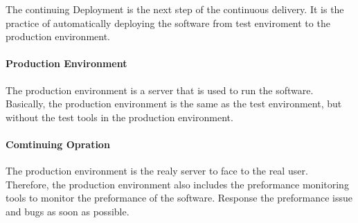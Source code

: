 The continuing Deployment is the next step of the continuous delivery.
It is the practice of automatically deploying the software from test enviroment
to the production environment.

\paragraph{Production Environment}
The production environment is a server that is used to run the software. 
Basically, the production environment is the same as the test environment,
but without the test tools in the production environment.

\paragraph{Comtinuing Opration}
The production environment is the realy server to face to the real user.
Therefore, the production environment also includes the preformance monitoring tools
to monitor the preformance of the software. Response the preformance issue and bugs
as soon as possible.

